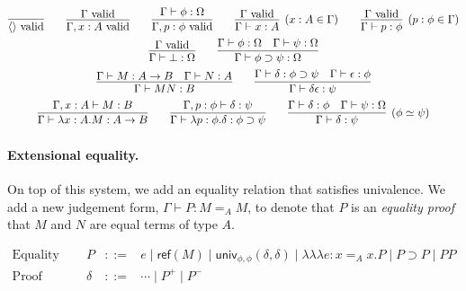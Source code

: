 \documentclass{easychair}
\newcommand{\vald}{\ \mathrm{valid}}
\newcommand{\univ}[4]{\mathsf{univ}_{{#1},{#2}} \left( {#3} , {#4} \right)}
\newcommand{\triplelambda}{\lambda \!\! \lambda \!\! \lambda}
\newcommand{\reff}[1]{\mathsf{ref} \left( {#1} \right)}
\begin{document}
\begin{gather*}
\infer{\langle \rangle \vald}{} \qquad
\infer{\Gamma, x : A \vald}{\Gamma \vald} \qquad 
\infer{\Gamma, p : \phi \vald}{\Gamma \vdash \phi : \Omega} \qquad
\infer[(x : A \in \Gamma)]{\Gamma \vdash x : A}{\Gamma \vald} \qquad
\infer[(p : \phi \in \Gamma)]{\Gamma \vdash p : \phi}{\Gamma \vald} \\
\infer{\Gamma \vdash \bot : \Omega}{\Gamma \vald} \qquad
\infer{\Gamma \vdash \phi \supset \psi : \Omega}{\Gamma \vdash \phi : \Omega \quad \Gamma \vdash \psi : \Omega} \\
\infer{\Gamma \vdash M N : B} {\Gamma \vdash M : A \rightarrow B \quad \Gamma \vdash N : A} \qquad
\infer{\Gamma \vdash \delta \epsilon : \psi} {\Gamma \vdash \delta : \phi \supset \psi \quad \Gamma \vdash \epsilon : \phi} \\
\infer{\Gamma \vdash \lambda x:A.M : A \rightarrow B}{\Gamma, x : A \vdash M : B} \qquad
\infer{\Gamma \vdash \lambda p : \phi . \delta : \phi \supset \psi}{\Gamma, p : \phi \vdash \delta : \psi} \qquad
\infer[(\phi \simeq \psi)]{\Gamma \vdash \delta : \psi}{\Gamma \vdash \delta : \phi \quad \Gamma \vdash \psi : \Omega}
\end{gather*}

\paragraph{Extensional equality.}

On top of this system, we add an equality relation that satisfies univalence.  We add a new judgement form,
$\Gamma \vdash P : M =_A M$, to denote that $P$ is an \emph{equality proof} that $M$ and $N$ are equal terms of type $A$.  

\[
\begin{array}{lrcl}
\text{Equality proof} & P & ::= & e \mid \reff{M} \mid \univ{\phi}{\phi}{\delta}{\delta} \mid \triplelambda e : x =_A x . P \mid P \supset P \mid PP \\
\text{Proof} & \delta & ::= & \cdots \mid P^+ \mid P^-
\end{array} \]
\end{document}
